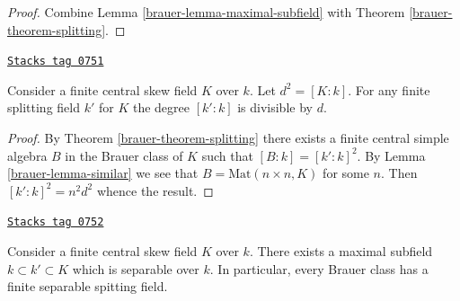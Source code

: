 \begin{proof}

Combine Lemma \ref{brauer-lemma-maximal-subfield} with
Theorem \ref{brauer-theorem-splitting}.
\end{proof}

\begin{lemma}
\label{brauer-lemma-splitting-field-degree}
\href{https://stacks.math.columbia.edu/tag/0751}{\texttt{Stacks tag 0751}}

Consider a finite central skew field $K$ over $k$. Let $d^2 = [K : k]$.
For any finite splitting field $k'$ for $K$ the degree $[k' : k]$ is
divisible by $d$.
\end{lemma}

\begin{proof}

By Theorem \ref{brauer-theorem-splitting} there exists a finite central
simple algebra $B$ in the Brauer class of $K$ such that
$[B : k] = [k' : k]^2$. By
Lemma \ref{brauer-lemma-similar}
we see that $B = \text{Mat}(n \times n, K)$ for some $n$.
Then $[k' : k]^2 = n^2d^2$ whence the result.
\end{proof}

\begin{proposition}
\label{brauer-proposition-separable-splitting-field}
\href{https://stacks.math.columbia.edu/tag/0752}{\texttt{Stacks tag 0752}}

Consider a finite central skew field $K$ over $k$.
There exists a maximal subfield $k \subset k' \subset K$ which
is separable over $k$.
In particular, every Brauer class has a finite separable
spitting field.
\end{proposition}

